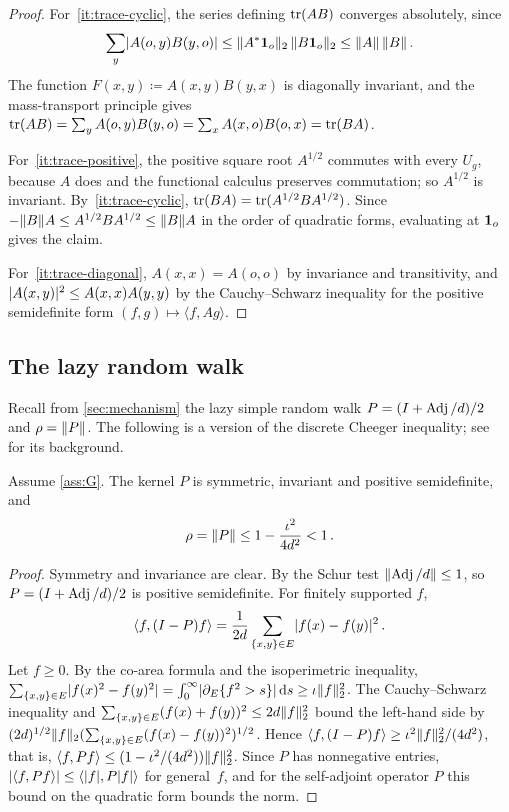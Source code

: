 \begin{proof}
For~\ref{it:trace-cyclic}, the series defining $\operatorname{tr}(AB)$ converges absolutely, since
\begin{equation*}
  \sum_y\lvert A(o,y)B(y,o)\rvert\le\lVert A^*\mathbf{1}_o\rVert_2\,\lVert B\mathbf{1}_o\rVert_2\le\lVert A\rVert\,\lVert B\rVert\,.
\end{equation*}
The function $F(x,y)\coloneqq A(x,y)B(y,x)$ is diagonally invariant, and the mass-transport principle
gives $\operatorname{tr}(AB)=\sum_yA(o,y)B(y,o)=\sum_xA(x,o)B(o,x)=\operatorname{tr}(BA)$.

For~\ref{it:trace-positive}, the positive square root $A^{1/2}$ commutes with every $U_g$, because $A$
does and the functional calculus preserves commutation; so $A^{1/2}$ is invariant. By~\ref{it:trace-cyclic},
$\operatorname{tr}(BA)=\operatorname{tr}(A^{1/2}BA^{1/2})$. Since $-\lVert B\rVert A\le A^{1/2}BA^{1/2}\le\lVert B\rVert A$ in the order of
quadratic forms, evaluating at $\mathbf{1}_o$ gives the claim.

For~\ref{it:trace-diagonal}, $A(x,x)=A(o,o)$ by invariance and transitivity, and
$\lvert A(x,y)\rvert^2\le A(x,x)A(y,y)$ by the Cauchy--Schwarz inequality for the positive semidefinite form
$(f,g)\mapsto\langle f,Ag\rangle$.
\end{proof}

\subsection{The lazy random walk}\label{sec:walk}

Recall from \cref{sec:mechanism} the lazy simple random walk $P=(I+\operatorname{Adj}/d)/2$ and
$\rho=\lVert P\rVert$. The following is a version of the discrete Cheeger inequality; see~\cite{Dod84} for its
background.

\begin{lemma}\label{lem:walk}
Assume \cref{ass:G}. The kernel $P$ is symmetric, invariant and positive semidefinite, and
\begin{equation*}
  \rho=\lVert P\rVert\le1-\frac{\iota^2}{4d^2}<1\,.
\end{equation*}
\end{lemma}

\begin{proof}
Symmetry and invariance are clear. By the Schur test $\lVert\operatorname{Adj}/d\rVert\le1$, so $P=(I+\operatorname{Adj}/d)/2$ is
positive semidefinite. For finitely supported $f$,
\begin{equation*}
  \langle f,(I-P)f\rangle=\frac1{2d}\sum_{\{x,y\}\in E}\lvert f(x)-f(y)\rvert^2\,.
\end{equation*}
Let $f\ge0$. By the co-area formula and the isoperimetric inequality,
$\sum_{\{x,y\}\in E}\lvert f(x)^2-f(y)^2\rvert=\int_0^\infty\lvert\partial_E\{f^2>s\}\rvert\,\mathrm{d} s\ge\iota\lVert f\rVert_2^2$.
The Cauchy--Schwarz inequality and $\sum_{\{x,y\}\in E}(f(x)+f(y))^2\le2d\lVert f\rVert_2^2$ bound the
left-hand side by $(2d)^{1/2}\lVert f\rVert_2(\sum_{\{x,y\}\in E}(f(x)-f(y))^2)^{1/2}$. Hence
$\langle f,(I-P)f\rangle\ge\iota^2\lVert f\rVert_2^2/(4d^2)$, that is,
$\langle f,Pf\rangle\le(1-\iota^2/(4d^2))\lVert f\rVert_2^2$. Since $P$ has nonnegative entries,
$\lvert\langle f,Pf\rangle\rvert\le\langle\lvert f\rvert,P\lvert f\rvert\rangle$ for general~$f$, and for the self-adjoint
operator $P$ this bound on the quadratic form bounds the norm.
\end{proof}

